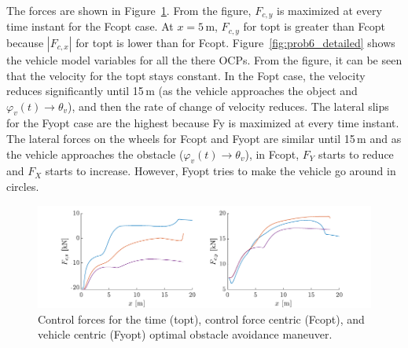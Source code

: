 \clearpage
The forces are shown in Figure~\ref{fig:prob6_forces}. From the figure, $F_{c,y}$ is maximized at every time instant for the Fcopt case. At $x = 5$\,m, $F_{c,y}$ for topt is greater than Fcopt because $|F_{c,x}|$ for topt is lower than for Fcopt. Figure~\ref{fig:prob6_detailed} shows the vehicle model variables for all the there OCPs. From the figure, it can be seen that the velocity for the topt stays constant. In the Fopt case, the velocity reduces significantly until 15\,m (as the vehicle approaches the object and $\varphi_v(t) \rightarrow \theta_v$), and then the rate of change of velocity reduces. The lateral slips for the Fyopt case are the highest because Fy is maximized at every time instant. The lateral forces on the wheels for Fcopt and Fyopt are similar until 15\,m and as the vehicle approaches the obstacle ($\varphi_v(t) \rightarrow \theta_v$), in Fcopt, $F_Y$ starts to reduce and $F_X$ starts to increase. However, Fyopt tries to make the vehicle go around in circles. 

\begin{figure}[h]
    \centering
    \includegraphics{figures/prob6_forces.pdf}
    \caption{Control forces for the time (topt), control force centric (Fcopt), and vehicle centric (Fyopt) optimal obstacle avoidance maneuver.}   
    \label{fig:prob6_forces}
\end{figure}

